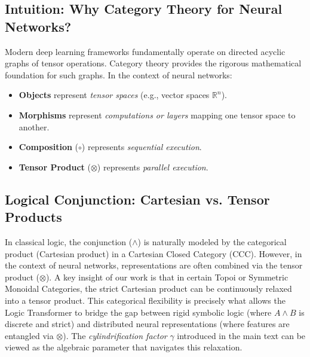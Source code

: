 \documentclass[runningheads]{llncs}
\begin{document}
\subsection{Intuition: Why Category Theory for Neural Networks?}
Modern deep learning frameworks fundamentally operate on directed acyclic graphs of tensor operations. Category theory provides the rigorous mathematical foundation for such graphs.
In the context of neural networks:
\begin{itemize}
	\item \textbf{Objects} represent \textit{tensor spaces} (e.g., vector spaces $\mathbb{R}^n$).
	\item \textbf{Morphisms} represent \textit{computations or layers} mapping one tensor space to another.
	\item \textbf{Composition} ($\circ$) represents \textit{sequential execution}.
	\item \textbf{Tensor Product} ($\otimes$) represents \textit{parallel execution}.
\end{itemize}

\subsection{Logical Conjunction: Cartesian vs. Tensor Products}
In classical logic, the conjunction ($\wedge$) is naturally modeled by the categorical product (Cartesian product) in a Cartesian Closed Category (CCC). However, in the context of neural networks, representations are often combined via the tensor product ($\otimes$).
A key insight of our work is that in certain Topoi or Symmetric Monoidal Categories, the strict Cartesian product can be continuously relaxed into a tensor product. This categorical flexibility is precisely what allows the Logic Transformer to bridge the gap between rigid symbolic logic (where $A \wedge B$ is discrete and strict) and distributed neural representations (where features are entangled via $\otimes$). The \textit{cylindrification factor} $\gamma$ introduced in the main text can be viewed as the algebraic parameter that navigates this relaxation.
\end{document}
